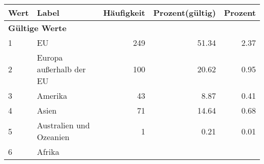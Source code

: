      \begin{longtable}{lXrrr}
     \toprule
     \textbf{Wert} & \textbf{Label} & \textbf{Häufigkeit} & \textbf{Prozent(gültig)} & \textbf{Prozent} \\
     \endhead
     \midrule
     \multicolumn{5}{l}{\textbf{Gültige Werte}}\\

     1 &
     \multicolumn{1}{X}{ EU   } &


       \num{249} &
       \num[round-mode=places,round-precision=2]{51.34} &
         \num[round-mode=places,round-precision=2]{2.37} \\

     2 &
     \multicolumn{1}{X}{ Europa außerhalb der EU   } &


       \num{100} &
       \num[round-mode=places,round-precision=2]{20.62} &
         \num[round-mode=places,round-precision=2]{0.95} \\

     3 &
     \multicolumn{1}{X}{ Amerika   } &


       \num{43} &
       \num[round-mode=places,round-precision=2]{8.87} &
         \num[round-mode=places,round-precision=2]{0.41} \\

     4 &
     \multicolumn{1}{X}{ Asien   } &


       \num{71} &
       \num[round-mode=places,round-precision=2]{14.64} &
         \num[round-mode=places,round-precision=2]{0.68} \\

     5 &
     \multicolumn{1}{X}{ Australien und Ozeanien   } &


       \num{1} &
       \num[round-mode=places,round-precision=2]{0.21} &
         \num[round-mode=places,round-precision=2]{0.01} \\

     6 &
     \multicolumn{1}{X}{ Afrika   } &



\end{longtable}
